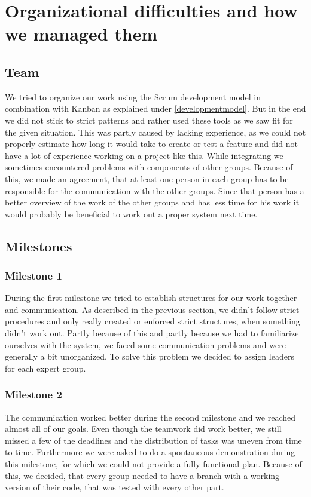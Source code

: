\documentclass[main.tex]{subfiles}
\begin{document}
	\begingroup

	\renewcommand{\cleardoublepage}{}

	\renewcommand{\clearpage}{}

	\chapter{Organizational difficulties and how we managed them}

		
		\section{Team}
		We tried to organize our work using the Scrum development model in combination with Kanban as explained under \ref{developmentmodel}. But in the end we did not stick to strict patterns and rather used these tools as we saw fit for the given situation. This was partly caused by lacking experience, as we could not properly estimate how long it would take to create or test a feature and did not have a lot of experience working on a project like this.
		While integrating we sometimes encountered problems with components of other groups. Because of this, we made an agreement, that at least one person in each group has to be responsible for the communication with the other groups. Since that person has a better overview of the work of the other groups and has less time for his work it would probably be beneficial to work out a proper system next time.
		
		\section{Milestones}
		
		\subsection{Milestone 1}
		During the first milestone we tried to establish structures for our work together and communication. As described in the previous section, we didn't follow strict procedures and only really created or enforced strict structures, when something didn't work out. Partly because of this and partly because we had to familiarize ourselves with the system, we faced some communication problems and were generally a bit unorganized. To solve this problem we decided to assign leaders for each expert group.
		
		\subsection{Milestone 2}
		The communication worked better during the second milestone and we reached almost all of our goals. Even though the teamwork did work better, we still missed a few of the deadlines and the distribution of tasks was uneven from time to time. Furthermore we were asked to do a spontaneous demonstration during this milestone, for which we could not provide a fully functional plan. Because of this, we decided, that every group needed to have a branch with a working version of their code, that was tested with every other part.
		
\end{document}
